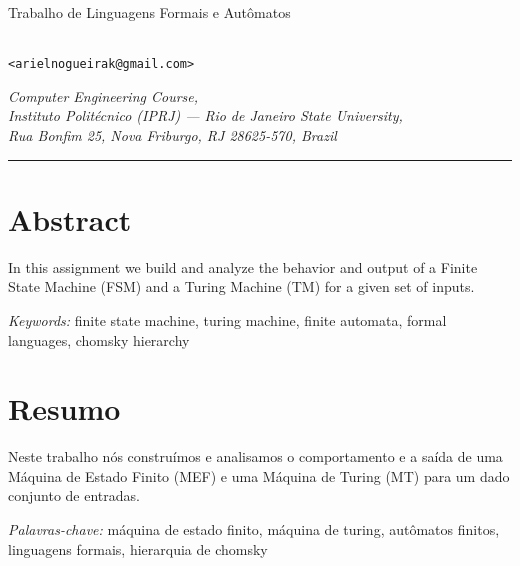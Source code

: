 \begin{center}
    \makeatletter

        {\Large Trabalho de Linguagens Formais e Autômatos \par}

        {\LARGE \@title \par}

        \vspace{0.5cm}
        {
            \large \@author \\
            \small \texttt{<arielnogueirak@gmail.com>}
            \par
        }

        \vspace{0.5cm}
        \textit{
           Computer Engineering Course, \\
           Instituto Politécnico (IPRJ) --- Rio de Janeiro State University, \\
           Rua Bonfim 25, Nova Friburgo, RJ 28625-570, Brazil
        }

        \vspace{0.5cm}
        \@date
    \makeatother

    \vspace{0.5cm}
    \hrule
\end{center}

\section*{Abstract}

In this assignment we build and analyze the behavior and output of a Finite
State Machine (FSM) and a Turing Machine (TM) for a given set of inputs.

\medskip
\noindent
\textit{Keywords:} finite state machine, turing machine, finite automata,
formal languages, chomsky hierarchy

\section*{Resumo}

Neste trabalho nós construímos e analisamos o comportamento e a saída de uma
Máquina de Estado Finito (MEF) e uma Máquina de Turing (MT) para um dado
conjunto de entradas.

\medskip
\noindent
\textit{Palavras-chave:} máquina de estado finito, máquina de turing, autômatos
finitos, linguagens formais, hierarquia de chomsky